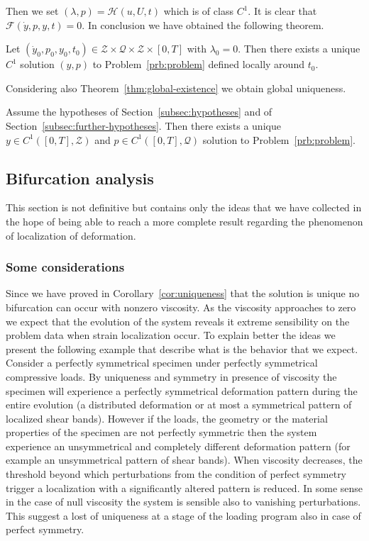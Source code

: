 Then we set $(\lambda,p)=\mathscr{H}(u,U,t)$ which is of class $C^1$. It is clear that $\mathcal{F}(\dot y,p,y,t)=0$. In conclusion we have obtained the following theorem.
\begin{thm}
Let $(\dot y_0,p_0,y_0,t_0)\in\mathscr{Z}\times\mathscr{Q}\times\mathscr{Z}\times[0,T]$ with $\lambda_0=0$. Then there exists a unique $C^1$ solution $(y,p)$ to Problem~\ref{prb:problem} defined locally around $t_0$.
\end{thm}
Considering also Theorem~\ref{thm:global-existence} we obtain global uniqueness.
\begin{cor}
\label{cor:uniqueness}
Assume the hypotheses of Section~\ref{subsec:hypotheses} and of Section~\ref{subsec:further-hypotheses}. Then there exists a unique $y\in C^1([0,T],\mathscr{Z})$ and $p\in C^1([0,T],\mathscr{Q})$ solution to Problem~\ref{prb:problem}.
\end{cor}

\subsection{Bifurcation analysis}
\label{subsec:bifurcation}

\begin{rmk}
This section is not definitive but contains only the ideas that we have collected in the hope of being able to reach a more complete result regarding the phenomenon of localization of deformation.
\end{rmk}

\subsubsection*{Some considerations}

Since we have proved in Corollary~\ref{cor:uniqueness} that the solution is unique no bifurcation can occur with nonzero viscosity. As the viscosity approaches to zero we expect that the evolution of the system reveals it extreme sensibility on the problem data when strain localization occur. To explain better the ideas we present the following example that describe what is the behavior that we expect. Consider a perfectly symmetrical specimen under perfectly symmetrical compressive loads. By uniqueness and symmetry in presence of viscosity the specimen will experience a perfectly symmetrical deformation pattern during the entire evolution (a distributed deformation or at most a symmetrical pattern of localized shear bands). However if the loads, the geometry or the material properties of the specimen are not perfectly symmetric then the system experience an unsymmetrical and completely different deformation pattern (for example an unsymmetrical pattern of shear bands). When viscosity decreases, the threshold beyond which perturbations from the condition of perfect symmetry trigger a localization with a significantly altered pattern is reduced. In some sense in the case of null viscosity the system is sensible also to vanishing perturbations. This suggest a lost of uniqueness at a stage of the loading program also in case of perfect symmetry.

